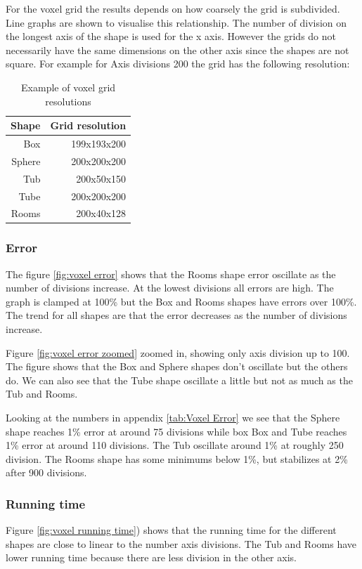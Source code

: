 \documentclass[11pt,twoside,a4paper]{report}
\begin{document}
For the voxel grid the results depends on how coarsely the grid is subdivided. Line graphs are shown to visualise this relationship. The number of division on the longest axis of the shape is used for the x axis. However the grids do not necessarily have the same dimensions on the other axis since the shapes are not square. For example for Axis divisions 200 the grid has the following resolution:
\begin{table}[htbp]
  \centering
  \caption{Example of voxel grid resolutions}
    \begin{tabular}{rr}
    \toprule
    Shape & Grid resolution \\
    \midrule
    Box   & 199x193x200 \\
    Sphere & 200x200x200 \\
    Tub   & 200x50x150 \\
    Tube  & 200x200x200 \\
    Rooms & 200x40x128 \\
    \bottomrule
    \end{tabular}%
  \label{tab:addlabel}%
\end{table}%



\subsubsection{Error}
The figure \ref{fig:voxel error} shows that the Rooms shape error oscillate as the number of divisions increase. At the lowest divisions all errors are high. The graph is clamped at 100\% but the Box and Rooms shapes have errors over 100\%. The trend for all shapes are that the error decreases as the number of divisions increase.

Figure \ref{fig:voxel error zoomed} zoomed in, showing only axis division up to 100. The figure shows that the Box and Sphere shapes don’t oscillate but the others do. We can also see that the Tube shape oscillate a little but not as much as the Tub and Rooms.

Looking at the numbers in appendix \ref{tab:Voxel Error} we see that the Sphere shape reaches 1\% error at around 75 divisions while box Box and Tube reaches 1\% error at around 110 divisions. The Tub oscillate around 1\% at roughly 250 division. The Rooms shape has some minimums below 1\%, but stabilizes at 2\% after 900 divisions.

\subsubsection{Running time}
Figure \ref{fig:voxel running time}) shows that the running time for the different shapes are close to linear to the number axis divisions. The Tub and Rooms have lower running time because there are less division in the other axis.
\end{document}
